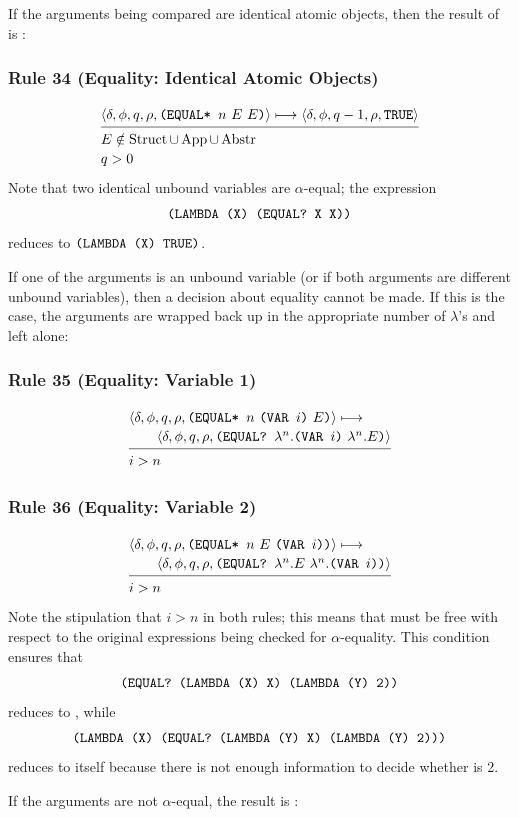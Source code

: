 If the arguments being compared are identical atomic objects, then the result of
 is :

\subsubsection*{Rule 34 (Equality: Identical Atomic Objects)}
\[
\semanticrule{
\cfg{\delta}{\phi}{q}{\rho}{\THOR{(EQUAL* }n\ E\ E\THOR{)}}\redsto
      \cfg{\delta}{\phi}{q-1}{\rho}{\THOR{TRUE}}
}{
E\notin\Struct\cup\App\cup\Abstr\\ q>0
}
\]
Note that two identical unbound variables are \(\alpha\)-equal; the expression
\[
\texttt{(LAMBDA (X) (EQUAL? X X))}
\]
reduces to \(\texttt{(LAMBDA (X) TRUE)}\).

If one of the arguments is an unbound variable (or if both arguments are
different unbound variables), then a decision about equality cannot be made. If
this is the case, the arguments are wrapped back up in the appropriate number of
\(\lambda\)'s and left alone:

\subsubsection*{Rule 35 (Equality: Variable 1)}
\[
\semanticrule{
\cfg{\delta}{\phi}{q}{\rho}{\THOR{(EQUAL* }n\ \THOR{(VAR }i\THOR{)}\ E\THOR{)}}\redsto\\ \qquad
      \cfg{\delta}{\phi}{q}{\rho}{\THOR{(EQUAL? }\lambda^n.\THOR{(VAR }i\THOR{)}\ \lambda^n.E\THOR{)}}
}{
i>n
}
\]

\subsubsection*{Rule 36 (Equality: Variable 2)}
\[
\semanticrule{
\cfg{\delta}{\phi}{q}{\rho}{\THOR{(EQUAL* }n\ E\ \THOR{(VAR }i\THOR{)}\THOR{)}}\redsto\\ \qquad
      \cfg{\delta}{\phi}{q}{\rho}{\THOR{(EQUAL? }\lambda^n.E\ \lambda^n.\THOR{(VAR }i\THOR{)}\THOR{)}}
}{
i>n
}
\]
Note the stipulation that \(i>n\) in both rules; this means that 
must be free with respect to the original expressions being checked for
\(\alpha\)-equality. This condition ensures that
\[
\texttt{(EQUAL? (LAMBDA (X) X) (LAMBDA (Y) 2))}
\]
reduces to , while
\[
\texttt{(LAMBDA (X) (EQUAL? (LAMBDA (Y) X) (LAMBDA (Y) 2)))}
\]
reduces to itself because there is not enough information to decide whether
 is 2.

If the arguments are not \(\alpha\)-equal, the result is :

